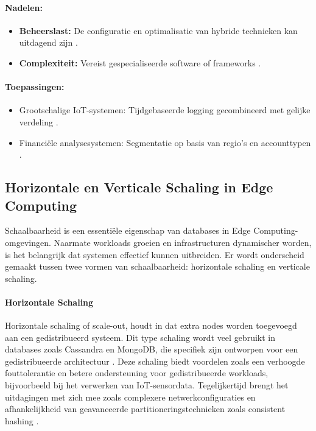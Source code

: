 \paragraph{Nadelen:}
\begin{itemize}
    \item \textbf{Beheerslast:} De configuratie en optimalisatie van hybride technieken kan uitdagend zijn \autocite{Mahmud2020}.
    \item \textbf{Complexiteit:} Vereist gespecialiseerde software of frameworks \autocite{Mahmud2020}.
\end{itemize}

\paragraph{Toepassingen:}
\begin{itemize}
    \item Grootschalige IoT-systemen: Tijdgebaseerde logging gecombineerd met gelijke verdeling \autocite{Mahmud2020}.
    \item Financiële analysesystemen: Segmentatie op basis van regio's en accounttypen \autocite{Mahmud2020}.
\end{itemize}

\subsection{Horizontale en Verticale Schaling in Edge Computing}

Schaalbaarheid is een essentiële eigenschap van databases in Edge Computing-omgevingen. Naarmate workloads groeien en infrastructuren dynamischer worden, is het belangrijk dat systemen effectief kunnen uitbreiden. Er wordt onderscheid gemaakt tussen twee vormen van schaalbaarheid: horizontale schaling en verticale schaling.

\paragraph{Horizontale Schaling}
Horizontale schaling of scale-out, houdt in dat extra nodes worden toegevoegd aan een gedistribueerd systeem. Dit type schaling wordt veel gebruikt in databases zoals Cassandra en MongoDB, die specifiek zijn ontworpen voor een gedistribueerde architectuur \autocite{Kleppmann2017}.  
Deze schaling biedt voordelen zoals een verhoogde fouttolerantie en betere ondersteuning voor gedistribueerde workloads, bijvoorbeeld bij het verwerken van IoT-sensordata. 
Tegelijkertijd brengt het uitdagingen met zich mee zoals complexere netwerkconfiguraties en afhankelijkheid van geavanceerde partitioneringstechnieken zoals consistent hashing \autocite{Mahmud2020}.

